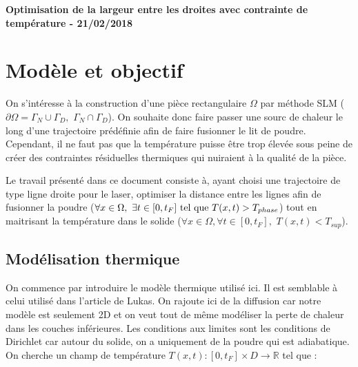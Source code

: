 \documentclass[11pt,a4paper]{article}
\begin{document}
\newcommand{\heavi}{h_{\epsilon}}
\newcommand{\heaviP}{h'_{\epsilon}}
\newcommand{\heaviPP}{h''_{\epsilon}}

\newcommand{\Math}[1]{\textcolor{red}{\textbf{#1}}}

\newcommand{\intO}{\int_{\Omega}}
\newcommand{\bigintO}{\bigint_{\Omega}}
\newcommand{\accDeuxcol}[1]{\left\{\begin{array}{ll}#1\end{array}\right.}
\newcommand{\accUnecol}[1]{\left\{\begin{array}{l}#1\end{array}\right.}

\newcommand{\stilde}{\tilde{s}}
\begin{center}
	\textbf{Optimisation de la largeur entre les droites avec contrainte de température - 21/02/2018}
\end{center}


\section*{Modèle et objectif}

On s'intéresse à la construction d'une pièce rectangulaire $\Omega$ par méthode SLM ($\partial\Omega=\Gamma_N\cup\Gamma_D,\,\,\Gamma_N\cap\Gamma_D$). On souhaite donc faire passer une sourc de chaleur le long d'une trajectoire prédéfinie afin de faire fusionner le lit de poudre. Cependant, il ne faut pas que la température puisse être trop élevée sous peine de créer des contraintes résiduelles thermiques qui nuiraient à la qualité de la pièce. 

\vspace{0.5cm}

Le travail présenté dans ce document consiste à, ayant choisi une trajectoire de type ligne droite pour le laser, optimiser la distance entre les lignes afin de fusionner la poudre ($\forall x\in\Omega,\,\,\exists t\in[0,t_F]\,\,\textrm{tel\,\,que}\,\,T(x,t)>T_{phase}$) tout en maitrisant la température dans le solide ($\forall x\in\Omega,\forall t\in [0,t_F],\,\,T(x,t)<T_{sup}$).

\subsection*{Modélisation thermique}
On commence par introduire le modèle thermique utilisé ici. Il est semblable à celui utilisé dans l'article de Lukas. On rajoute ici de la diffusion car notre modèle est seulement 2D et on veut tout de même modéliser la perte de chaleur dans les couches inférieures. Les conditions aux limites sont les conditions de Dirichlet car autour du solide, on a uniquement de la poudre qui est adiabatique. On cherche un champ de température $T(x,t) : [0,t_F]\times D \rightarrow \mathbb{R}$ tel que :
\end{document}
